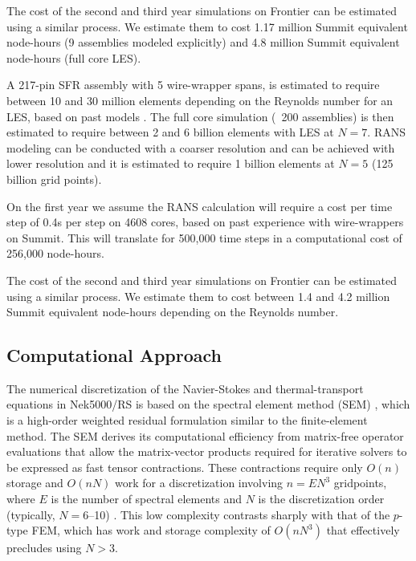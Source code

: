 The cost of the second and third year simulations on Frontier can be estimated using a similar process. We estimate them to cost 1.17 million Summit equivalent node-hours (9 assemblies modeled explicitly) and 4.8 million Summit equivalent node-hours (full core LES).

A 217-pin SFR assembly with 5 wire-wrapper spans, is estimated to require between 10 and 30 million elements depending on the Reynolds number for an LES, based on past models \cite{merzari2020toward}. The full core simulation (~200 assemblies) is then estimated to require between 2 and 6 billion elements with LES at $N=7$.  RANS modeling can be conducted with a coarser resolution and can be achieved with lower resolution and it is estimated to require 1 billion elements at $N=5$ (125 billion grid points).

On the first year we assume the RANS calculation will require a cost per time step of 0.4s per step on 4608 cores, based on past experience with wire-wrappers on Summit.  This will translate for 500,000 time steps in a computational cost of 256,000 node-hours.

The cost of the second and third year simulations on Frontier can be estimated using a similar process. We estimate them to cost between 1.4 and 4.2 million Summit equivalent node-hours depending on the Reynolds number.

\vspace{-.25in}
\subsection{Computational Approach }
\vspace{-.2in}

The numerical discretization of the Navier-Stokes and thermal-transport equations
in Nek5000/RS is based on the spectral element method (SEM) \cite{pat84}, which
is a high-order weighted residual formulation similar to the finite-element method.   
The SEM derives its computational efficiency from matrix-free operator
evaluations that allow the matrix-vector products required for iterative
solvers to be expressed as fast tensor contractions.  These contractions
require only $O(n)$ storage and $O(nN)$ work for a discretization involving
$n=EN^3$ gridpoints, where $E$ is the number of spectral elements and $N$ is
the discretization order (typically, $N=$6--10) \cite{dfm02}.  This low
complexity contrasts sharply with that of the $p$-type FEM, which has work and
storage complexity of $O(nN^3)$ that effectively precludes using $N>3$.  

